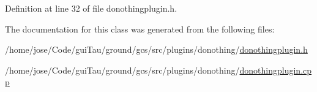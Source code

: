 Definition at line 32 of file donothingplugin.\-h.



The documentation for this class was generated from the following files\-:\begin{DoxyCompactItemize}
\item 
/home/jose/\-Code/gui\-Tau/ground/gcs/src/plugins/donothing/\hyperlink{donothingplugin_8h}{donothingplugin.\-h}\item 
/home/jose/\-Code/gui\-Tau/ground/gcs/src/plugins/donothing/\hyperlink{donothingplugin_8cpp}{donothingplugin.\-cpp}\end{DoxyCompactItemize}
